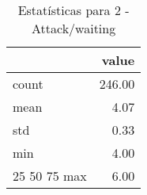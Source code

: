 \begin{table}[htbp]
\caption{Estatísticas para 2 - Attack/waiting}
\label{tab:2_-_attack_waiting_summary}
\begin{tabular}{lr}
\toprule
 & value \\
\midrule
count & 246.00 \\
mean & 4.07 \\
std & 0.33 \\
min & 4.00 \\
25%
50%
75%
max & 6.00 \\
\bottomrule
\end{tabular}
\end{table}
